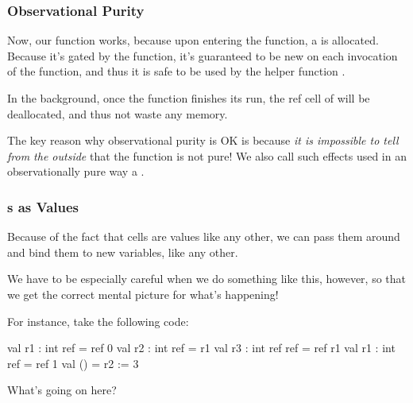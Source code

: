 \documentclass[aspectratio=169]{beamer}
\begin{document}
\begin{frame}[fragile]
  \frametitle{Observational Purity}

  \ptmt

  Now, our  function works, because upon entering the function, a
   is allocated. Because it's gated by the function, it's guaranteed
  to be new on each invocation of the function, and thus it is
  safe to be used by the helper function .

  \pause
  \vspace{\fill}

  In the background, once the  function finishes its run, the ref
  cell of  will be deallocated, and thus not waste any memory.

  \pause
  \vspace{\fill}


  \pause
  \vspace{\fill}

  The key reason why observational purity is OK is because \textit{it is impossible
  to tell from the outside} that the function is not pure! We also call such
  effects used in an observationally pure way a .
\end{frame}


\begin{frame}[fragile]
  \frametitle{s as Values}

  Because of the fact that  cells are values like any other, we can
  pass them around and bind them to new variables, like any other.

  \pause
  \vspace{\fill}

  We have to be especially careful when we do something like this, however,
  so that we get the correct mental picture for what's happening!

  \pause
  \vspace{\fill}

  For instance, take the following code:

  \begin{codeblock}
    val r1 : int ref     = ref 0
    val r2 : int ref     = r1
    val r3 : int ref ref = ref r1
    val r1 : int ref     = ref 1
    val ()               = r2 := 3
  \end{codeblock}

  \pause
  \vspace{\fill}

  What's going on here?
\end{frame}
\end{document}
